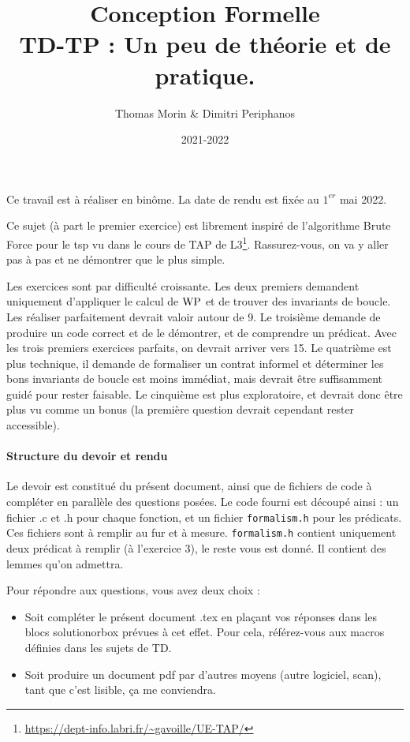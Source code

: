 \documentclass[11pt,answers]{exam}
\author{Thomas Morin & Dimitri Periphanos}
\date{2021-2022}
\title{{\bf Conception Formelle} \\ TD-TP : Un peu de théorie et de pratique.}
\begin{document}
\maketitle

Ce travail est à réaliser en binôme. La date de rendu est fixée au $1^{er}$ mai 2022.

Ce sujet (à part le premier exercice) est librement inspiré de l’algorithme Brute Force pour le tsp vu dans le cours de TAP de L3\footnote{\url{https://dept-info.labri.fr/~gavoille/UE-TAP/}}.
Rassurez-vous, on va y aller pas à pas et ne démontrer que le plus simple.

Les exercices sont par difficulté croissante. Les deux premiers demandent uniquement d’appliquer le calcul de $\mathrm{WP}$ et de trouver des invariants de boucle.
Les réaliser parfaitement devrait valoir autour de 9.
Le troisième demande de produire un code correct et de le démontrer, et de comprendre un prédicat. Avec les trois premiers exercices parfaits, on devrait arriver vers 15.
Le quatrième est plus technique, il demande de formaliser un contrat informel et déterminer les bons invariants de boucle est moins immédiat, mais devrait être suffisamment guidé pour rester faisable.
Le cinquième est plus exploratoire, et devrait donc être plus vu comme un bonus (la première question devrait cependant rester accessible).

\paragraph{Structure du devoir et rendu}

Le devoir est constitué du présent document, ainsi que de fichiers de code à compléter en parallèle des questions posées.
Le code fourni est découpé ainsi : un fichier .c et .h pour chaque fonction, et 
un fichier \texttt{formalism.h} pour les prédicats.
Ces fichiers sont à remplir au fur et à mesure. \texttt{formalism.h} contient uniquement deux prédicat à remplir (à l’exercice 3), le reste vous est donné. Il contient des lemmes qu’on admettra.

Pour répondre aux questions, vous avez deux choix :
\begin{itemize}
    \item Soit compléter le présent document .tex en plaçant vos réponses dans les blocs solutionorbox prévues à cet effet. Pour cela, référez-vous aux macros définies dans les sujets de TD.
    \item Soit produire un document pdf par d’autres moyens (autre logiciel, scan), tant que c’est lisible, ça me conviendra.
\end{itemize}
\end{document}
